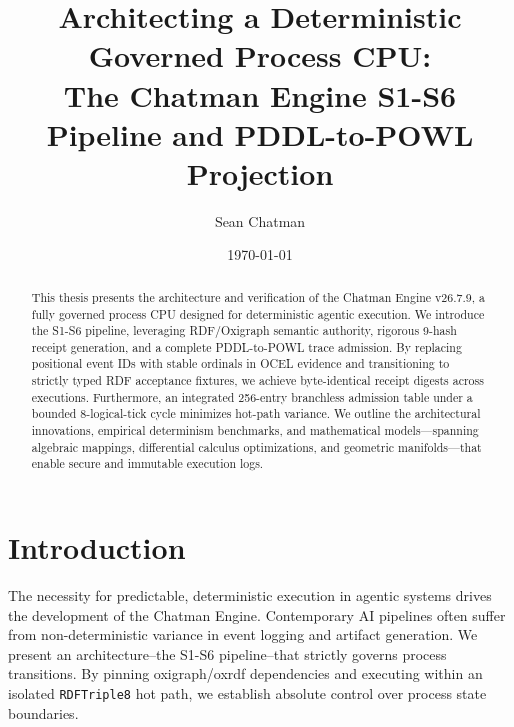\documentclass[12pt, a4paper]{report}
\title{\textbf{Architecting a Deterministic Governed Process CPU: \\ The Chatman Engine S1-S6 Pipeline and PDDL-to-POWL Projection}}
\author{Sean Chatman}
\date{\today}
\begin{document}
\maketitle

\begin{abstract}
This thesis presents the architecture and verification of the Chatman Engine v26.7.9, a fully governed process CPU designed for deterministic agentic execution. We introduce the S1-S6 pipeline, leveraging RDF/Oxigraph semantic authority, rigorous 9-hash receipt generation, and a complete PDDL-to-POWL trace admission. By replacing positional event IDs with stable ordinals in OCEL evidence and transitioning to strictly typed RDF acceptance fixtures, we achieve byte-identical receipt digests across executions. Furthermore, an integrated 256-entry branchless admission table under a bounded 8-logical-tick cycle minimizes hot-path variance. We outline the architectural innovations, empirical determinism benchmarks, and mathematical models---spanning algebraic mappings, differential calculus optimizations, and geometric manifolds---that enable secure and immutable execution logs.
\end{abstract}

\tableofcontents

\chapter{Introduction}
The necessity for predictable, deterministic execution in agentic systems drives the development of the Chatman Engine. Contemporary AI pipelines often suffer from non-deterministic variance in event logging and artifact generation. We present an architecture--the S1-S6 pipeline--that strictly governs process transitions. By pinning oxigraph/oxrdf dependencies and executing within an isolated \texttt{RDFTriple8} hot path, we establish absolute control over process state boundaries.
\end{document}
